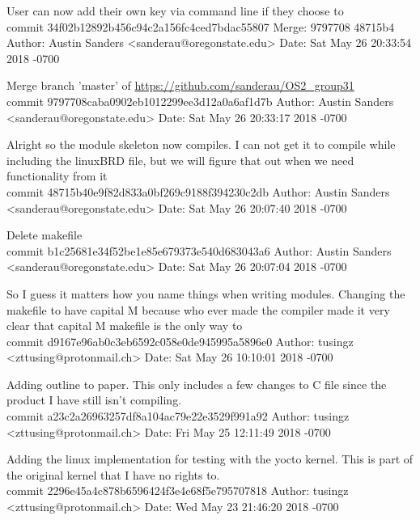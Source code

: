 \documentclass[onecolumn, draftclsnofoot,10pt, compsoc]{IEEEtran}
\begin{document}
{    User can now add their own key via command line if they choose to\\

commit 34f02b12892b456c94c2a156fc4ced7bdac55807
Merge: 9797708 48715b4
Author: Austin Sanders <sanderau@oregonstate.edu>
Date:   Sat May 26 20:33:54 2018 -0700

    Merge branch 'master' of \url{https://github.com/sanderau/OS2_group31}\\

commit 9797708caba0902eb1012299ee3d12a0a6af1d7b
Author: Austin Sanders <sanderau@oregonstate.edu>
Date:   Sat May 26 20:33:17 2018 -0700

    Alright so the module skeleton now compiles. I can not get it to compile while including the linuxBRD file, but we will figure that out when we need functionality from it\\

commit 48715b40e9f82d833a0bf269c9188f394230c2db
Author: Austin Sanders <sanderau@oregonstate.edu>
Date:   Sat May 26 20:07:40 2018 -0700

    Delete makefile\\

commit b1c25681e34f52be1e85e679373e540d683043a6
Author: Austin Sanders <sanderau@oregonstate.edu>
Date:   Sat May 26 20:07:04 2018 -0700

    So I guess it matters how you name things when writing modules. Changing the makefile to have capital M because who ever made the compiler made it very clear that capital M makefile is the only way to \\

commit d9167e96ab0c3eb6592c058e0de945995a5896e0
Author: tusingz <zttusing@protonmail.ch>
Date:   Sat May 26 10:10:01 2018 -0700

    Adding outline to paper. This only includes a few changes to C file since the product I have still isn't compiling.\\

commit a23c2a26963257df8a104ac79e22e3529f991a92
Author: tusingz <zttusing@protonmail.ch>
Date:   Fri May 25 12:11:49 2018 -0700

    Adding the linux implementation for testing with the yocto kernel. This is part of the original kernel that I have no rights to.\\

commit 2296e45a4c878b6596424f3e4e68f5e795707818
Author: tusingz <zttusing@protonmail.ch>
Date:   Wed May 23 21:46:20 2018 -0700

}
\end{document}
